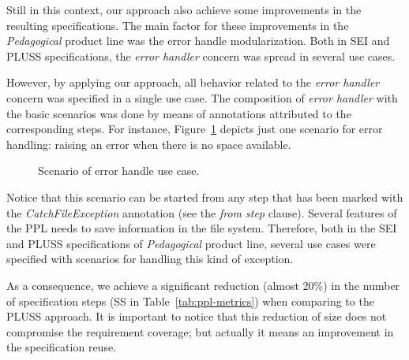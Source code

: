 \documentclass{acm_proc_article-sp}
\begin{document}
Still in this context, our approach also achieve some improvements in the resulting specifications. The main factor for these improvements in the \emph{Pedagogical} product line was the error handle modularization. Both in SEI and PLUSS specifications, the \emph{error handler} concern was spread in several use cases.    

However, by applying our approach, all behavior related to the \emph{error handler} concern was specified in a single use case. The composition of \emph{error handler} with the basic scenarios was done by means of annotations attributed to the corresponding steps. For instance, Figure~\ref{fig:error-handle} depicts just one scenario for error handling: raising  an error when there is no space available. 

\begin{figure}[h]
\caption{Scenario of error handle use case.}
\label{fig:error-handle}
\end{figure}
    
Notice that this scenario can be started from any step that has been marked with the \emph{CatchFileException} annotation (see the \emph{from step} clause). Several features of the PPL needs to save information in the file system. Therefore, both in the SEI and PLUSS specifications of \emph{Pedagogical} product line, several use cases were specified with scenarios for handling this kind of exception.


As a consequence, we achieve a significant reduction (almost 20\%) in the number of specification steps (SS in Table~\ref{tab:ppl-metrics}) when comparing to the PLUSS approach. It is important to notice that this reduction of size does not compromise the requirement coverage; but actually it means an improvement in the specification reuse.
\end{document}
